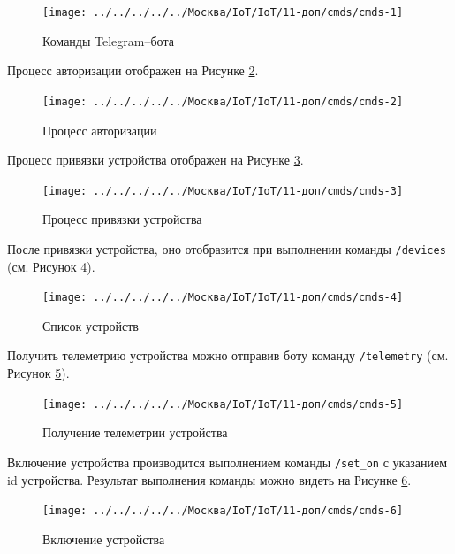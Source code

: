 \documentclass[a4paper,14pt]{extarticle}
\begin{document}
\begin{figure}[h!]
	\centering
	\texttt{[image: ../../../../../Москва/IoT/IoT/11-доп/cmds/cmds-1]}
	\caption{Команды Telegram--бота}
	\label{fig:cmds-1}
\end{figure}

Процесс авторизации отображен на Рисунке \ref{fig:cmds-2}.
\begin{figure}[h!]
	\centering
	\texttt{[image: ../../../../../Москва/IoT/IoT/11-доп/cmds/cmds-2]}
	\caption{Процесс авторизации}
	\label{fig:cmds-2}
\end{figure}

Процесс привязки устройства отображен на Рисунке \ref{fig:cmds-3}.
\begin{figure}[h!]
	\centering
	\texttt{[image: ../../../../../Москва/IoT/IoT/11-доп/cmds/cmds-3]}
	\caption{Процесс привязки устройства}
	\label{fig:cmds-3}
\end{figure}

После привязки устройства, оно отобразится при выполнении команды \texttt{/devices} (см. Рисунок \ref{fig:cmds-4}).

\begin{figure}[h!]
	\centering
	\texttt{[image: ../../../../../Москва/IoT/IoT/11-доп/cmds/cmds-4]}
	\caption{Список устройств}
	\label{fig:cmds-4}
\end{figure}

Получить телеметрию устройства можно отправив боту команду \texttt{/telemetry} (см. Рисунок \ref{fig:cmds-5}).

\begin{figure}[h!]
	\centering
	\texttt{[image: ../../../../../Москва/IoT/IoT/11-доп/cmds/cmds-5]}
	\caption{Получение телеметрии устройства}
	\label{fig:cmds-5}
\end{figure}


Включение устройства производится выполнением команды \texttt{/set\_on} с указанием \mbox{id} устройства. Результат выполнения команды можно видеть на Рисунке \ref{fig:cmds-6}.

\begin{figure}[h!]
	\centering
	\texttt{[image: ../../../../../Москва/IoT/IoT/11-доп/cmds/cmds-6]}
	\caption{Включение устройства}
	\label{fig:cmds-6}
\end{figure}
\end{document}
